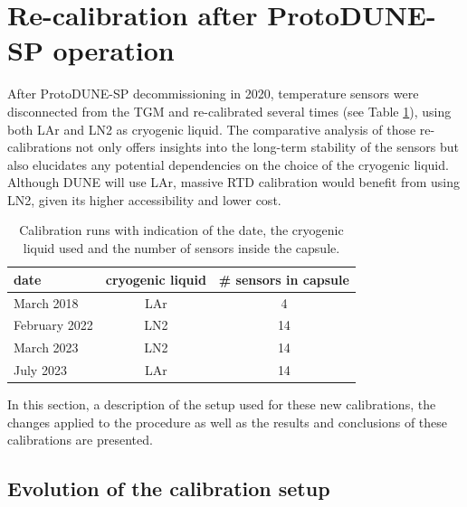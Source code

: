 \section{Re-calibration after ProtoDUNE-SP operation}
\label{sec:new_calib}

\noindent After ProtoDUNE-SP decommissioning in 2020, temperature sensors were disconnected from the TGM and re-calibrated several times (see Table \ref{tab:calib}), using both LAr and LN2 as cryogenic liquid. The comparative analysis of those re-calibrations not only offers insights into the long-term stability of the sensors but also elucidates any potential dependencies on the choice of the cryogenic liquid. Although DUNE will use LAr, massive RTD calibration would benefit from using LN2, given its higher accessibility and lower cost.

\begin{table}[htbp]
\begin{center}
\begin{tabular}{l c c}
date & cryogenic liquid & \# sensors in capsule  \\ \hline
March 2018     &   LAr    &  4  \\
February 2022  &   LN2    & 14  \\
March 2023     &   LN2    & 14  \\
July 2023      &   LAr    & 14  \\
\end{tabular}
\end{center}
\caption{Calibration runs with indication of the date, the cryogenic liquid used and the number of sensors inside the capsule.}
\label{tab:calib}
\end{table}

In this section, a description of the setup used for these new calibrations, the changes applied to the procedure as well as the results and conclusions of these calibrations are presented.

\subsection{Evolution of the calibration setup}
\label{sec:new_calib_setup}


